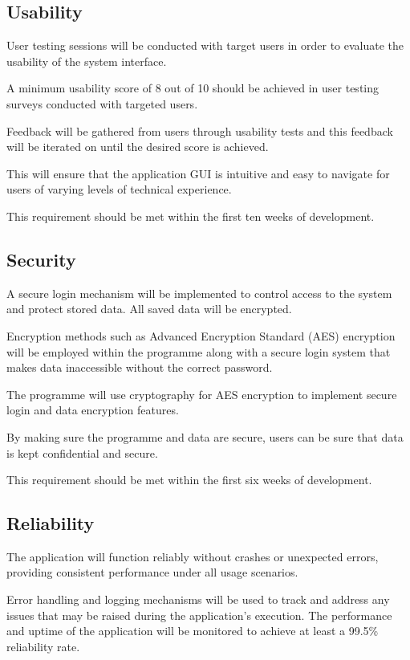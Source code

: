     \subsection{Usability}
    User testing sessions will be conducted with target users in order to evaluate the usability of the system interface.

    A minimum usability score of 8 out of 10 should be achieved in user testing surveys conducted with targeted users.

    Feedback will be gathered from users through usability tests and this feedback will be iterated on until the desired score is achieved.

    This will ensure that the application GUI is intuitive and easy to navigate for users of varying levels of technical experience.

    This requirement should be met within the first ten weeks of development.

    \subsection{Security}
    A secure login mechanism will be implemented to control access to the system and protect stored data. All saved data will be encrypted.

    Encryption methods such as Advanced Encryption Standard (AES) encryption will be employed within the programme along with a secure login system that makes data inaccessible without the correct password.

    The programme will use cryptography for AES encryption to implement secure login and data encryption features.

    By making sure the programme and data are secure, users can be sure that data is kept confidential and secure.

    This requirement should be met within the first six weeks of development.

    \subsection{Reliability}
    The application will function reliably without crashes or unexpected errors, providing consistent performance under all usage scenarios.

    Error handling and logging mechanisms will be used to track and address any issues that may be raised during the application's execution. The performance and uptime of the application will be monitored to achieve at least a 99.5\% reliability rate.


